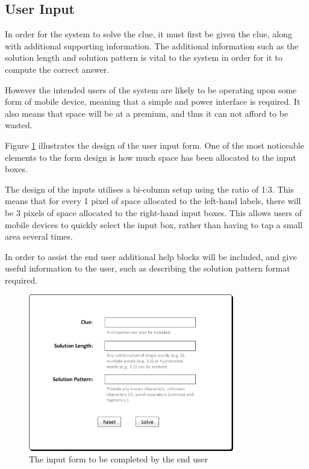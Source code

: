 \subsection{User Input} 
\label{sub:user_input}

In order for the system to solve the clue, it must first be given the clue, 
along with additional supporting information. The additional information such as 
the solution length and solution pattern is vital to the system in order for it 
to compute the correct answer. 

However the intended users of the system are likely to be operating upon some 
form of mobile device, meaning that a simple and power interface is required. It
also means that space will be at a premium, and thus it can not afford to be 
wasted.

Figure \ref{fig:input_form} illustrates the design of the user input form. One 
of the most noticeable elements to the form design is how much space has been 
allocated to the input boxes. 

The design of the inputs utilises a bi-column setup using the ratio of 1:3. This
means that for every 1 pixel of space allocated to the left-hand labels, there 
will be 3 pixels of space allocated to the right-hand input boxes. This allows 
users of mobile devices to quickly select the input box, rather than having to 
tap a small area several times.

In order to assist the end user additional help blocks will be included, and 
give useful information to the user, such as describing the solution pattern 
format required.

\begin{figure}[H]
  \centering
  \includegraphics[width=0.8\textwidth]{ui/form.jpg}
  \caption{The input form to be completed by the end user}
  \label{fig:input_form}
\end{figure}

